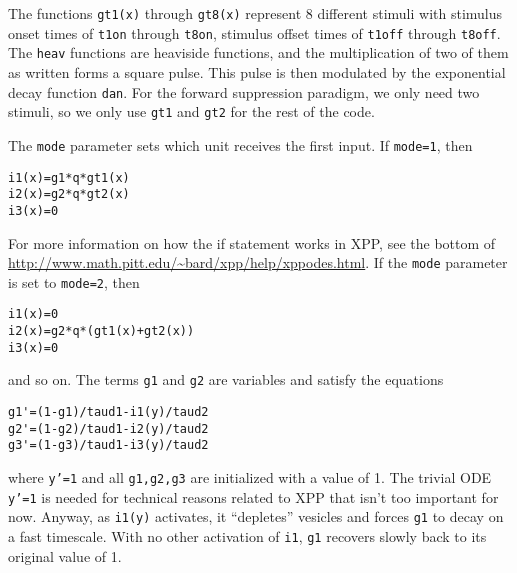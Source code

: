 \documentclass[a4paper,10pt]{article}
\newcommand{\y}[1]{{\texttt{#1}}}
\begin{document}
The functions \y{gt1(x)} through \y{gt8(x)} represent 8 different stimuli with stimulus onset times of \y{t1on} through \y{t8on}, stimulus offset times of \y{t1off} through \y{t8off}. The \y{heav} functions are heaviside functions, and the multiplication of two of them as written forms a square pulse. This pulse is then modulated by the exponential decay function \y{dan}. For the forward suppression paradigm, we only need two stimuli, so we only use \y{gt1} and \y{gt2} for the rest of the code.

The \y{mode} parameter sets which unit receives the first input. If \y{mode=1}, then
\begin{verbatim}
i1(x)=g1*q*gt1(x)
i2(x)=g2*q*gt2(x)
i3(x)=0
\end{verbatim}
For more information on how the if statement works in XPP, see the bottom of \url{http://www.math.pitt.edu/~bard/xpp/help/xppodes.html}. If the \y{mode} parameter is set to \y{mode=2}, then
\begin{verbatim}
i1(x)=0
i2(x)=g2*q*(gt1(x)+gt2(x))
i3(x)=0
\end{verbatim}
and so on. The terms \y{g1} and \y{g2} are variables and satisfy the equations
\begin{verbatim}
g1'=(1-g1)/taud1-i1(y)/taud2
g2'=(1-g2)/taud1-i2(y)/taud2
g3'=(1-g3)/taud1-i3(y)/taud2
\end{verbatim}
where \y{y'=1} and all \y{g1,g2,g3} are initialized with a value of 1. The trivial ODE \y{y'=1} is needed for technical reasons related to XPP that isn't too important for now. Anyway, as \y{i1(y)} activates, it ``depletes'' vesicles and forces \y{g1} to decay on a fast timescale. With no other activation of \y{i1}, \y{g1} recovers slowly back to its original value of 1.
\end{document}

